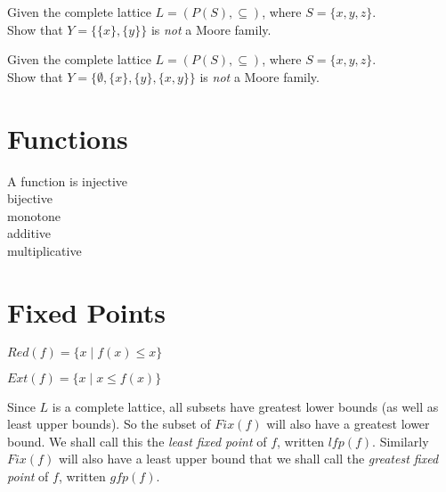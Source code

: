 \frmrule 

\begin{example}
Given the complete lattice $L = (P(S), \subseteq)$, where $S = \{x,y,z\}$. \\
Show that $Y = \{ \{ x \}, \{ y \} \}$ is \textit{not} a Moore family.
\end{example}

\frmrule 

\begin{example}
Given the complete lattice $L = (P(S), \subseteq)$, where $S = \{x,y,z\}$. \\
Show that $Y = \{ \emptyset, \{ x \}, \{ y \}, \{ x,y \} \}$ is \textit{not} a Moore family.
\end{example}


\section{Functions}




A function is 
injective \\
bijective \\
monotone  \\
additive  \\
multiplicative \\

\frmrule 




\section{Fixed Points}



$Red(f) = \{x \;|\; f(x) \leqslant x\}$ 

$Ext(f) = \{x \;|\; x \leqslant f(x)\}$ 


Since $L$ is a complete lattice, all subsets have greatest lower bounds 
(as well as least upper bounds). 
So the subset of $Fix(f)$ will also have a greatest lower bound. 
We shall call this the \textit{least fixed point} of $f$, written $lfp(f)$. 
Similarly $Fix(f)$ will also have a least upper bound
that we shall call the \textit{greatest fixed point} of $f$, written $gfp(f)$. 

